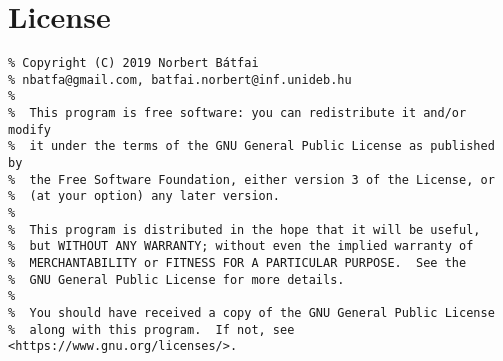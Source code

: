 \section*{License}

{\footnotesize
\begin{verbatim}
% Copyright (C) 2019 Norbert Bátfai
% nbatfa@gmail.com, batfai.norbert@inf.unideb.hu
%
%  This program is free software: you can redistribute it and/or modify
%  it under the terms of the GNU General Public License as published by
%  the Free Software Foundation, either version 3 of the License, or
%  (at your option) any later version.
%
%  This program is distributed in the hope that it will be useful,
%  but WITHOUT ANY WARRANTY; without even the implied warranty of
%  MERCHANTABILITY or FITNESS FOR A PARTICULAR PURPOSE.  See the
%  GNU General Public License for more details.
%
%  You should have received a copy of the GNU General Public License
%  along with this program.  If not, see <https://www.gnu.org/licenses/>.
\end{verbatim}
}
